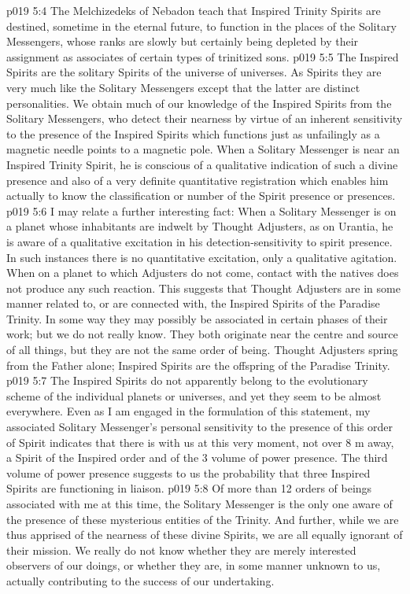 \vs p019 5:4 The Melchizedeks of Nebadon teach that Inspired Trinity Spirits are destined, sometime in the eternal future, to function in the places of the Solitary Messengers, whose ranks are slowly but certainly being depleted by their assignment as associates of certain types of trinitized sons.
\vs p019 5:5 \pc The Inspired Spirits are the solitary Spirits of the universe of universes. As Spirits they are very much like the Solitary Messengers except that the latter are distinct personalities. We obtain much of our knowledge of the Inspired Spirits from the Solitary Messengers, who detect their nearness by virtue of an inherent sensitivity to the presence of the Inspired Spirits which functions just as unfailingly as a magnetic needle points to a magnetic pole. When a Solitary Messenger is near an Inspired Trinity Spirit, he is conscious of a qualitative indication of such a divine presence and also of a very definite quantitative registration which enables him actually to know the classification or number of the Spirit presence or presences.
\vs p019 5:6 I may relate a further interesting fact: When a Solitary Messenger is on a planet whose inhabitants are indwelt by Thought Adjusters, as on Urantia, he is aware of a qualitative excitation in his detection\hyp{}sensitivity to spirit presence. In such instances there is no quantitative excitation, only a qualitative agitation. When on a planet to which Adjusters do not come, contact with the natives does not produce any such reaction. This suggests that Thought Adjusters are in some manner related to, or are connected with, the Inspired Spirits of the Paradise Trinity. In some way they may possibly be associated in certain phases of their work; but we do not really know. They both originate near the centre and source of all things, but they are not the same order of being. Thought Adjusters spring from the Father alone; Inspired Spirits are the offspring of the Paradise Trinity.
\vs p019 5:7 The Inspired Spirits do not apparently belong to the evolutionary scheme of the individual planets or universes, and yet they seem to be almost everywhere. Even as I am engaged in the formulation of this statement, my associated Solitary Messenger’s personal sensitivity to the presence of this order of Spirit indicates that there is with us at this very moment, not over 8 m away, a Spirit of the Inspired order and of the 3 volume of power presence. The third volume of power presence suggests to us the probability that three Inspired Spirits are functioning in liaison.
\vs p019 5:8 \pc Of more than 12 orders of beings associated with me at this time, the Solitary Messenger is the only one aware of the presence of these mysterious entities of the Trinity. And further, while we are thus apprised of the nearness of these divine Spirits, we are all equally ignorant of their mission. We really do not know whether they are merely interested observers of our doings, or whether they are, in some manner unknown to us, actually contributing to the success of our undertaking.
